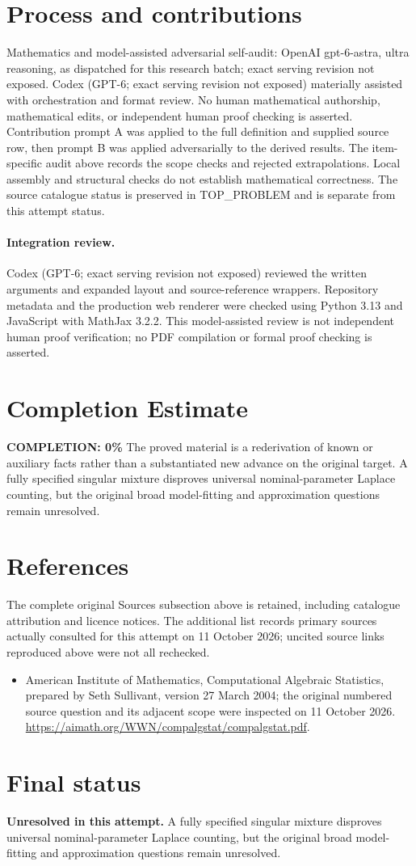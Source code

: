 \documentclass[11pt]{article}
\begin{document}
\section{Process and contributions}
Mathematics and model-assisted adversarial self-audit: OpenAI gpt-6-astra, ultra reasoning, as dispatched for this research batch; exact serving revision not exposed. Codex (GPT-6; exact serving revision not exposed) materially assisted with orchestration and format review. No human mathematical authorship, mathematical edits, or independent human proof checking is asserted.
Contribution prompt A was applied to the full definition and supplied source row, then prompt B was applied adversarially to the derived results. The item-specific audit above records the scope checks and rejected extrapolations. Local assembly and structural checks do not establish mathematical correctness. The source catalogue status is preserved in TOP\_PROBLEM and is separate from this attempt status.
\paragraph{Integration review.} Codex (GPT-6; exact serving revision not exposed) reviewed the written arguments and expanded layout and source-reference wrappers. Repository metadata and the production web renderer were checked using Python 3.13 and JavaScript with MathJax 3.2.2. This model-assisted review is not independent human proof verification; no PDF compilation or formal proof checking is asserted.

\section{Completion Estimate}
\noindent\textbf{COMPLETION: 0\%}
The proved material is a rederivation of known or auxiliary facts rather than a substantiated new advance on the original target. A fully specified singular mixture disproves universal nominal-parameter Laplace counting, but the original broad model-fitting and approximation questions remain unresolved.
\section{References}
The complete original Sources subsection above is retained, including catalogue attribution and licence notices. The additional list records primary sources actually consulted for this attempt on 11 October 2026; uncited source links reproduced above were not all rechecked.
\begin{itemize}
\item American Institute of Mathematics, Computational Algebraic Statistics, prepared by Seth Sullivant, version 27 March 2004; the original numbered source question and its adjacent scope were inspected on 11 October 2026. \url{https://aimath.org/WWN/compalgstat/compalgstat.pdf}.
\end{itemize}
\section{Final status}
\textbf{Unresolved in this attempt.} A fully specified singular mixture disproves universal nominal-parameter Laplace counting, but the original broad model-fitting and approximation questions remain unresolved.
\end{document}
